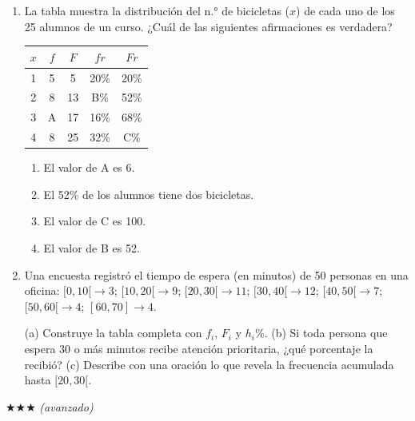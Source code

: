 \documentclass[11pt, letterpaper]{article}
\begin{document}
\begin{enumerate}[label=\textbf{\arabic*.}, leftmargin=*, resume]
  \item La tabla muestra la distribución del n.° de bicicletas ($x$) de cada uno de los 25 alumnos de un curso. ¿Cuál de las siguientes afirmaciones es verdadera?
  \begin{center}
  \renewcommand{\arraystretch}{1.3}
  \begin{tabular}{c c c c c}
  \toprule
  $x$ & $f$ & $F$ & $fr$ & $Fr$\\
  \midrule
  1 & 5 & 5 & 20\% & 20\%\\
  2 & 8 & 13 & B\% & 52\%\\
  3 & A & 17 & 16\% & 68\%\\
  4 & 8 & 25 & 32\% & C\%\\
  \bottomrule
  \end{tabular}
  \end{center}
  \begin{enumerate}[label=\Alph*),leftmargin=14pt]
    \item El valor de A es 6.
    \item El 52\% de los alumnos tiene dos bicicletas.
    \item El valor de C es 100.
    \item El valor de B es 52.
  \end{enumerate}

  \item Una encuesta registró el tiempo de espera (en minutos) de 50 personas en una oficina:
  $[0,10[ \to 3$;\; $[10,20[ \to 9$;\; $[20,30[ \to 11$;\; $[30,40[ \to 12$;\; $[40,50[ \to 7$;\; $[50,60[ \to 4$;\; $[60,70] \to 4$.

  (a) Construye la tabla completa con $f_i$, $F_i$ y $h_i\%$.
  (b) Si toda persona que espera 30 o más minutos recibe atención prioritaria, ¿qué porcentaje la recibió?
  (c) Describe con una oración lo que revela la frecuencia acumulada hasta $[20,30[$.
\end{enumerate}

$\bigstar\bigstar\bigstar$ \textit{(avanzado)}
\end{document}
